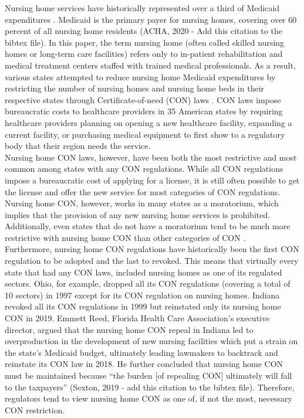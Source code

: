 \documentclass[../Main.tex]{subfiles}
\begin{document}
Nursing home services have historically represented over a third of Medicaid expenditures \citep{wiener1999controlling}. Medicaid is the primary payer for nursing homes, covering over 60 percent of all nursing home residents (ACHA, 2020 - Add this citation to the bibtex file). In this paper, the term nursing home (often called skilled nursing homes or long-term care facilities) refers only to in-patient rehabilitation and medical treatment centers staffed with trained medical professionals. As a result, various states attempted to reduce nursing home Medicaid expenditures by restricting the number of nursing homes and nursing home beds in their respective states through Certificate-of-need (CON) laws \citep{feder1980regulating,grabowski2003effects,rahman2016impact}. CON laws impose bureaucratic costs to healthcare providers in 35 American states by requiring healthcare providers planning on opening a new healthcare facility, expanding a current facility, or purchasing medical equipment to first show to a regulatory body that their region needs the service.\\
\indent Nursing home CON laws, however, have been both the most restrictive and most common among states with any CON regulations. While all CON regulations impose a bureaucratic cost of applying for a license, it is still often possible to get the license and offer the new service for most categories of CON regulations.  Nursing home CON, however, works in many states as a moratorium, which implies that the provision of any new nursing home services is prohibited. Additionally, even states that do not have a moratorium tend to be much more restrictive with nursing home CON than other categories of CON \citep{american2020american}.\\
\indent Furthermore, nursing home CON regulations have historically been the first CON regulation to be adopted and the last to revoked. This means that virtually every state that had any CON laws, included nursing homes as one of its regulated sectors. Ohio, for example, dropped all its CON regulations (covering a total of 10 sectors) in 1997 except for its CON regulation on nursing homes. Indiana revoked all its CON regulations in 1999 but reinstated only its nursing home CON in 2019. Emmett Reed, Florida Health Care Association’s executive director, argued that the nursing home CON repeal in Indiana led to overproduction in the development of new nursing facilities which put a strain on the state’s Medicaid budget, ultimately leading lawmakers to backtrack and reinstate its CON law in 2018. He further concluded that nursing home CON must be maintained because “the burden [of repealing CON] ultimately will fall to the taxpayers” (Sexton, 2019 - add this citation to the bibtex file). Therefore, regulators tend to view nursing home CON as one of, if not the most, necessary CON restriction.\\
\end{document}
